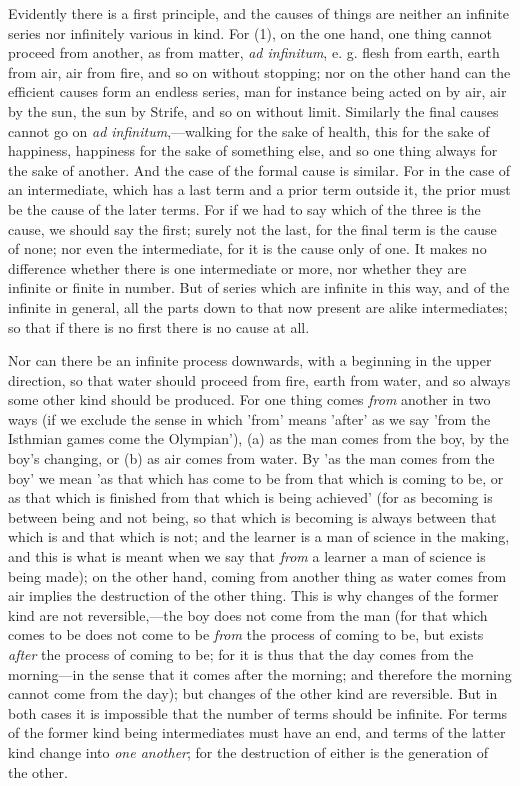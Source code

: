 
Evidently there is a first principle, and the causes of things are neither an infinite series nor infinitely various in kind. For (1), on the one hand, one thing cannot proceed from another, as from matter, \emph{ad infinitum}, e. g. flesh from earth, earth from air, air from fire, and so on without stopping; nor on the other hand can the efficient causes form an endless series, man for instance being acted on by air, air by the sun, the sun by Strife, and so on without limit. Similarly the final causes cannot go on \emph{ad infinitum},—walking for the sake of health, this for the sake of happiness, happiness for the sake of something else, and so one thing always for the sake of another. And the case of the formal cause is similar. For in the case of an intermediate, which has a last term and a prior term outside it, the prior must be the cause of the later terms. For if we had to say which of the three is the cause, we should say the first; surely not the last, for the final term is the cause of none; nor even the intermediate, for it is the cause only of one. It makes no difference whether there is one intermediate or more, nor whether they are infinite or finite in number. But of series which are infinite in this way, and of the infinite in general, all the parts down to that now present are alike intermediates; so that if there is no first there is no cause at all.

Nor can there be an infinite process downwards, with a beginning in the upper direction, so that water should proceed from fire, earth from water, and so always some other kind should be produced. For one thing comes \emph{from} another in two ways (if we exclude the sense in which 'from' means 'after' as we say 'from the Isthmian games come the Olympian'), (a) as the man comes from the boy, by the boy's changing, or (b) as air comes from water. By 'as the man comes from the boy' we mean 'as that which has come to be from that which is coming to be, or as that which is finished from that which is being achieved' (for as becoming is between being and not being, so that which is becoming is always between that which is and that which is not; and the learner is a man of science in the making, and this is what is meant when we say that \emph{from} a learner a man of science is being made); on the other hand, coming from another thing as water comes from air implies the destruction of the other thing. This is why changes of the former kind are not reversible,—the boy does not come from the man (for that which comes to be does not come to be \emph{from} the process of coming to be, but exists \emph{after} the process of coming to be; for it is thus that the day comes from the morning—in the sense that it comes after the morning; and therefore the morning cannot come from the day); but changes of the other kind are reversible. But in both cases it is impossible that the number of terms should be infinite. For terms of the former kind being intermediates must have an end, and terms of the latter kind change into \emph{one another}; for the destruction of either is the generation of the other.

